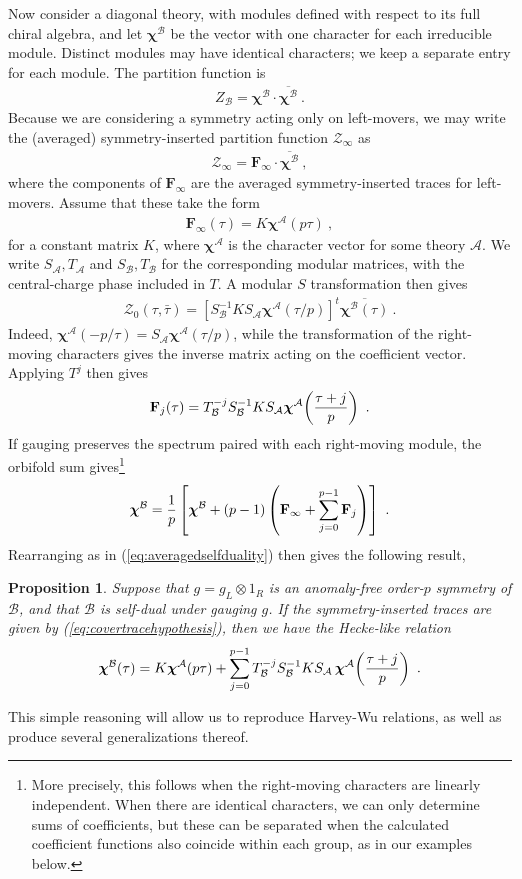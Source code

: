 \documentclass[12pt]{article}
\numberwithin{equation}{section}
\newcommand{\bea}{\begin{eqnarray}}
\newcommand{\eea}{\end{eqnarray}}
\def\cA{\mathcal{A}}
\def\cB{\mathcal{B}}
\def\cZ{\mathcal{Z}}
\newtheorem{proposition}{Proposition}[section]
\theoremstyle{remark}
\begin{document}
Now consider a diagonal theory, with modules defined with respect to its full chiral algebra, and let $\boldsymbol{\chi}^{\cB}$ be the vector with one character for each irreducible module. Distinct modules may have identical characters; we keep a separate entry for each module. The partition function is
\bea
Z_{\cB}=\boldsymbol{\chi}^{\cB} \cdot \overline{\boldsymbol{\chi}^{\cB}}~.
\eea
Because we are considering a symmetry acting only on left-movers, we may write the (averaged) symmetry-inserted partition function $\cZ_\infty$ as 
\bea 
\cZ_\infty=\mathbf{F_\infty}\cdot \overline{\boldsymbol{\chi}^{\cB}}~,
\eea
where the components of $\mathbf{F_\infty}$ are the averaged symmetry-inserted traces for left-movers. Assume that these take the form
\bea \label{eq:covertracehypothesis}
\mathbf{F_\infty}(\tau)=K\boldsymbol{\chi}^{\cA}(p\tau)~,
\eea
for a constant matrix $K$, where $\boldsymbol{\chi}^{\cA}$ is the character vector for some theory $\cA$. We write $S_{\cA},T_{\cA}$ and $S_{\cB},T_{\cB}$ for the corresponding modular matrices, with the central-charge phase included in $T$.
A modular $S$ transformation then gives
\bea 
\cZ_0(\tau,\bar\tau)
=\left[S_{\cB}^{-1}K S_{\cA}\boldsymbol{\chi}^{\cA}(\tau/p)\right]^t\overline{\boldsymbol{\chi}^{\cB}(\tau)}~.
\eea
Indeed, $\boldsymbol{\chi}^{\cA}(-p/\tau)=S_{\cA}\boldsymbol{\chi}^{\cA}(\tau/p)$, while the transformation of the right-moving characters gives the inverse matrix acting on the coefficient vector. 
Applying $T^j$ then gives
\bea \label{eq:allcoefficients}
\mathbf{F}_j(\tau)=T_{\cB}^{-j}S_{\cB}^{-1}K S_{\cA}\boldsymbol{\chi}^{\cA}\!\left({\tau+j\over p}\right)~.
\eea
If gauging preserves the spectrum paired with each right-moving module, the orbifold sum gives\footnote{More precisely, this follows when the right-moving characters are linearly independent. When there are identical characters, we can only determine sums of coefficients, but these can be separated when the calculated coefficient functions also coincide within each group, as in our examples below. }
\bea
\boldsymbol{\chi}^{\cB}={1\over p}\left[\boldsymbol{\chi}^{\cB}+(p-1)\left(\mathbf F_\infty+\sum_{j=0}^{p-1}\mathbf F_j\right)\right]~.
\eea
Rearranging as in (\ref{eq:averagedselfduality}) then gives the following result,

\begin{proposition}
\label{prop:physicalhecke}
Suppose that $g=g_L\otimes 1_R$ is an anomaly-free order-$p$ symmetry of $\cB$, and that $\cB$ is self-dual under gauging $g$. If the symmetry-inserted traces are given by (\ref{eq:covertracehypothesis}), then we have the Hecke-like relation
\bea \label{eq:generalizedcharacteridentity}
\boldsymbol{\chi}^{\cB}(\tau)=K\boldsymbol{\chi}^{\cA}(p\tau)+\sum_{j=0}^{p-1}T_{\cB}^{-j}S_{\cB}^{-1}K S_{\cA}\,\boldsymbol{\chi}^{\cA}\!\left({\tau+j\over p}\right)~.
\eea
\end{proposition}
\noindent
This simple reasoning will allow us to reproduce Harvey-Wu relations, as well as produce several generalizations thereof. 
\end{document}
